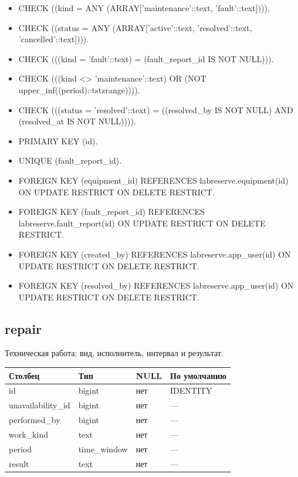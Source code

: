 \begin{itemize}
\item CHECK ((kind = ANY (ARRAY['maintenance'::text, 'fault'::text]))).
\item CHECK ((status = ANY (ARRAY['active'::text, 'resolved'::text, 'cancelled'::text]))).
\item CHECK (((kind = 'fault'::text) = (fault\_\allowbreak{}report\_\allowbreak{}id IS NOT NULL))).
\item CHECK (((kind <> 'maintenance'::text) OR (NOT upper\_\allowbreak{}inf((period)::tstzrange)))).
\item CHECK (((status = 'resolved'::text) = ((resolved\_\allowbreak{}by IS NOT NULL) AND (resolved\_\allowbreak{}at IS NOT NULL)))).
\item PRIMARY KEY (id).
\item UNIQUE (fault\_\allowbreak{}report\_\allowbreak{}id).
\item FOREIGN KEY (equipment\_\allowbreak{}id) REFERENCES labreserve.equipment(id) ON UPDATE RESTRICT ON DELETE RESTRICT.
\item FOREIGN KEY (fault\_\allowbreak{}report\_\allowbreak{}id) REFERENCES labreserve.fault\_\allowbreak{}report(id) ON UPDATE RESTRICT ON DELETE RESTRICT.
\item FOREIGN KEY (created\_\allowbreak{}by) REFERENCES labreserve.app\_\allowbreak{}user(id) ON UPDATE RESTRICT ON DELETE RESTRICT.
\item FOREIGN KEY (resolved\_\allowbreak{}by) REFERENCES labreserve.app\_\allowbreak{}user(id) ON UPDATE RESTRICT ON DELETE RESTRICT.
\end{itemize}
\par\noindent\begin{minipage}{\linewidth}
\subsection{repair}
Техническая работа: вид, исполнитель, интервал и результат.\par\smallskip\noindent
\begin{tabular}{p{}p{}p{}p{}}
\toprule Столбец & Тип & NULL & По умолчанию \\ \midrule
id & bigint & нет & IDENTITY \\
unavailability\_\allowbreak{}id & bigint & нет & — \\
performed\_\allowbreak{}by & bigint & нет & — \\
work\_\allowbreak{}kind & text & нет & — \\
period & time\_\allowbreak{}window & нет & — \\
result & text & нет & — \\
\bottomrule\end{tabular}\end{minipage}\par
